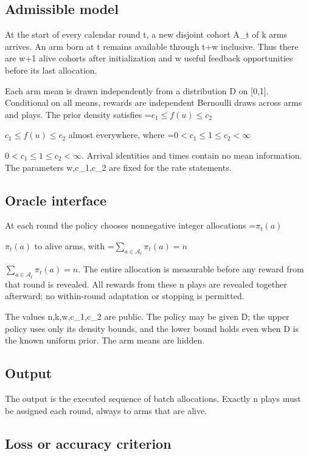 \documentclass[10pt,a4paper]{article}
\newcommand{\AtlasMath}[1]{\par\begingroup\centering\setbox0=\hbox{$\displaystyle #1$}\ifdim\wd0>1.4\linewidth\typeout{ATLAS WIDE FORMULA: \the\wd0}\fi\ifdim\wd0>\linewidth\resizebox{\linewidth}{!}{\box0}\else\box0\fi\par\endgroup}
\newcommand{\AtlasInlineMath}[1]{\begingroup\setbox0=\hbox{$#1$}\ifdim\wd0>.4\linewidth\endgroup\AtlasMath{#1}\else\endgroup$#1$\fi}
\begin{document}
\subsection{Admissible model}


At the start of every calendar round t, a new disjoint cohort A\_t of k arms arrives. An arm born at t remains available through t+w inclusive. Thus there are w+1 alive cohorts after initialization and w useful feedback opportunities before its last allocation.



Each arm mean is drawn independently from a distribution D on [0,1]. Conditional on all means, rewards are independent Bernoulli draws across arms and plays. The prior density satisfies \AtlasInlineMath{c_1\le f(u)\le c_2} almost everywhere, where \AtlasInlineMath{0<c_1\le1\le c_2<\infty}. Arrival identities and times contain no mean information. The parameters w,c\_1,c\_2 are fixed for the rate statements.



\subsection{Oracle interface}


At each round the policy chooses nonnegative integer allocations \AtlasInlineMath{\pi_t(a)} to alive arms, with \AtlasInlineMath{\sum_{a\in\mathcal A_t}\pi_t(a)=n}. The entire allocation is measurable before any reward from that round is revealed. All rewards from these n plays are revealed together afterward; no within-round adaptation or stopping is permitted.



The values n,k,w,c\_1,c\_2 are public. The policy may be given D; the upper policy uses only its density bounds, and the lower bound holds even when D is the known uniform prior. The arm means are hidden.



\subsection{Output}


The output is the executed sequence of batch allocations. Exactly n plays must be assigned each round, always to arms that are alive.



\subsection{Loss or accuracy criterion}
\end{document}

